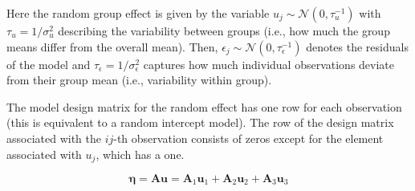 \documentclass[
  letterpaper,
  DIV=11,
  numbers=noendperiod]{scrartcl}
\begin{document}
Here the random group effect is given by the variable
\(u_j \sim \mathcal{N}(0, \tau^{-1}_u)\) with \(\tau_u = 1/\sigma^2_u\)
describing the variability between groups (i.e., how much the group
means differ from the overall mean). Then,
\(\epsilon_j \sim \mathcal{N}(0, \tau^{-1}_\epsilon)\) denotes the
residuals of the model and \(\tau_\epsilon = 1/\sigma^2_\epsilon\)
captures how much individual observations deviate from their group mean
(i.e., variability within group).

The model design matrix for the random effect has one row for each
observation (this is equivalent to a random intercept model). The row of
the design matrix associated with the \(ij\)-th observation consists of
zeros except for the element associated with \(u_j\), which has a one.

\[
\pmb{\eta} = \pmb{A}\pmb{u} = \pmb{A}_1\pmb{u}_1 + \pmb{A}_2\pmb{u}_2 + \pmb{A}_3\pmb{u}_3
\]
\end{document}
